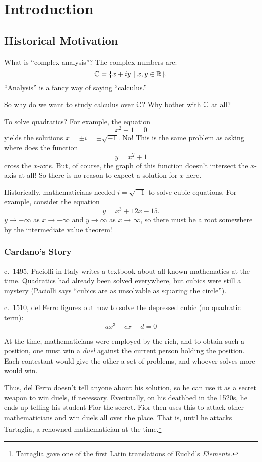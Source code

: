 \chapter{Introduction}
\section{Historical Motivation}
What is ``complex analysis''? The complex numbers are:
\[
  \mathbb{C} = \{x + iy \mid x, y \in \mathbb{R}\}
.\] 
``Analysis'' is a fancy way of saying ``calculus.''

So why do we want to study calculus over $\mathbb{C}$?
Why bother with $\mathbb{C}$ at all?

To solve quadratics? For example, the equation
\[x^2 + 1 = 0\]
yields the solutions $x = \pm i = \pm \sqrt{-1}$. No!
This is the same problem as asking where does the
function
\[y = x^2 + 1\]
cross the $x$-axis. But, of course, the graph of this
function doesn't intersect the $x$-axis at all! So there
is no reason to expect a solution for $x$ here.

Historically, mathematicians needed $i = \sqrt{-1}$
to solve cubic equations.
For example, consider the equation
\[y = x^3 + 12x - 15.\]
$y \to -\infty$ as $x \to -\infty$ and $y \to \infty$
as $x \to \infty$, so there must be a root somewhere by
the intermediate value theorem!

\subsection{Cardano's Story}
c.~1495, Paciolli in Italy writes a textbook about all
known mathematics at the time. Quadratics had already
been solved everywhere, but cubics were still a mystery
(Paciolli says ``cubics are as unsolvable as squaring
the circle'').

c.~1510, del Ferro figures out how to
solve the depressed cubic (no quadratic term):
\[ax^3 + cx + d = 0\]

At the time, mathematicians were employed by the rich,
and to obtain such a position, one must win a
\textit{duel} against the current person holding the
position. Each contestant would give the other a set
of problems, and whoever solves more would win.

Thus, del Ferro doesn't tell anyone about his solution,
so he can use it as a secret weapon to win duels, if
necessary. Eventually, on his deathbed in the
1520s, he ends up telling his student Fior the secret.
Fior then
uses this to attack other mathematicians and win duels
all over the place. That is, until he attacks Tartaglia,
a renowned mathematician at the time.\footnote{Tartaglia gave one of the first Latin
translations of Euclid's \textit{Elements}.}

